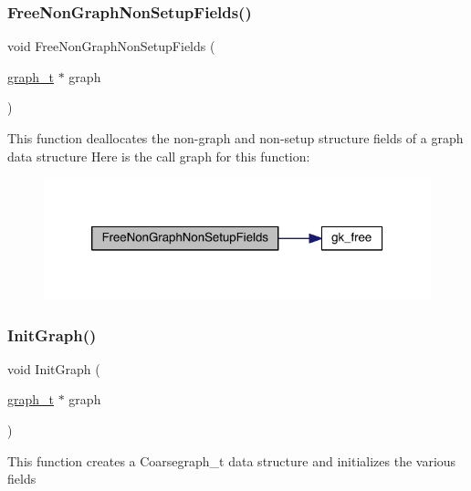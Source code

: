 \subsubsection{\texorpdfstring{Free\+Non\+Graph\+Non\+Setup\+Fields()}{FreeNonGraphNonSetupFields()}}
{\footnotesize\ttfamily void Free\+Non\+Graph\+Non\+Setup\+Fields (\begin{DoxyParamCaption}\item[{\hyperlink{a00734}{graph\+\_\+t} $\ast$}]{graph }\end{DoxyParamCaption})}

This function deallocates the non-\/graph and non-\/setup structure fields of a graph data structure Here is the call graph for this function\+:\nopagebreak
\begin{figure}[H]
\begin{center}
\leavevmode
\includegraphics[width=320pt]{a00852_a7f1865a64a8a13def4eacf3d253f970a_cgraph}
\end{center}
\end{figure}
\mbox{\label{a00852_af046766ada304a0cf49db44b544810a8}} 
\subsubsection{\texorpdfstring{Init\+Graph()}{InitGraph()}}
{\footnotesize\ttfamily void Init\+Graph (\begin{DoxyParamCaption}\item[{\hyperlink{a00734}{graph\+\_\+t} $\ast$}]{graph }\end{DoxyParamCaption})}

This function creates a Coarsegraph\+\_\+t data structure and initializes the various fields \mbox{\label{a00852_a010e2ad3dd68ae816d481fdcd4260583}} 
